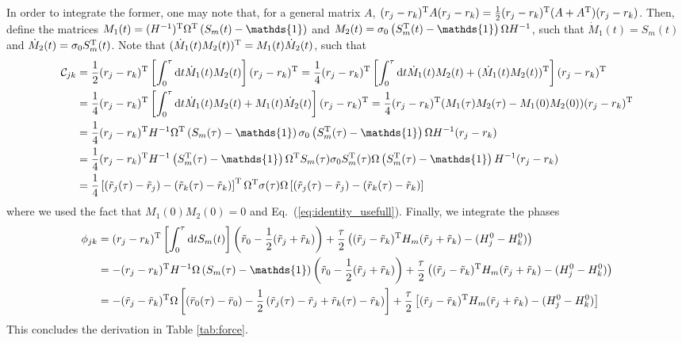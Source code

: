 \documentclass[%
reprint,
superscriptaddress,
nofootinbib,
 amsmath,amssymb,
prx,
floatfix,
]{revtex4-2}
\begin{document}
In order to integrate the former, one may note that, for a general matrix $A$,  $(r_j - r_k)^{\rm T} A (r_j - r_k)  = \frac{1}{2} (r_j - r_k)^{\rm T} (A+A^{\rm T}) (r_j - r_k)$. Then, define the matrices $M_1(t) = (H^{-1} )^{\rm T}  \Omega^{\rm T} \left(S_m(t) - \mathds{1} \right)  $ and $M_2(t) = \sigma_0 \left(S_m^{\rm T}(t) - \mathds{1} \right)  \Omega H^{-1}$, such that $\dot{M}_1(t)= S_m(t)$ and $ \dot{M}_2(t) =  \sigma_0 S_m^{\rm T} (t)$. Note that $(\dot{M}_1(t) M_2(t))^{\rm T} = M_1(t) \dot{M}_2(t)$, such that 
\begin{align}
    \mathcal{C}_{jk} &=  \frac{1}{2} (r_j - r_k)^{\rm T} \left[ \int_0^{\tau} \text{d} t \dot{M}_1(t) M_2(t)  \right] (r_j - r_k)^{\rm T} =  \frac{1}{4} (r_j - r_k)^{\rm T} \left[ \int_0^{\tau} \text{d} t  \dot{M}_1(t) M_2(t) + (\dot{M}_1(t) M_2(t))^{\rm T}  \right] (r_j - r_k)^{\rm T} \nonumber \\
    &=   \frac{1}{4} (r_j - r_k)^{\rm T} \left[ \int_0^{\tau} \text{d} t  \dot{M}_1(t) M_2(t) + M_1(t) \dot{M}_2(t) \right] (r_j - r_k)^{\rm T}  =   \frac{1}{4} (r_j - r_k)^{\rm T} ( M_1(\tau) M_2(\tau) - M_1(0) M_2(0))  (r_j - r_k)^{\rm T}\nonumber \\
    &=  \frac{1}{4} (r_j - r_k)^{\rm T} H^{-1}  \Omega^{\rm T} \left(S_m(\tau) - \mathds{1} \right)  \sigma_0 \left(S_m^{\rm T}(\tau) - \mathds{1} \right)  \Omega H^{-1} (r_j - r_k) \label{eq:integral_app_contr} \\
    &=  \frac{1}{4} (r_j - r_k)^{\rm T} H^{-1}  \left(S^{\rm T}_m(\tau) - \mathds{1} \right)  \Omega^{\rm T} S_m(\tau) \sigma_0 S^{\rm T}_m(\tau)\Omega  \left(S_m^{\rm T}(\tau) - \mathds{1} \right)  H^{-1} (r_j - r_k)\nonumber \\
    &=  \frac{1}{4} \left[ (\tilde{r}_j (\tau) - \tilde{r}_j)  - (\tilde{r}_k (\tau) - \tilde{r}_k ) \right]^{\rm T} \Omega^{\rm T} \sigma (\tau)   \Omega  \left[ (\tilde{r}_j (\tau) - \tilde{r}_j)  - (\tilde{r}_k (\tau) - \tilde{r}_k ) \right] 
\end{align}
where we used the fact that $M_1(0) M_2(0) = 0$ and Eq.~(\ref{eq:identity_usefull}). Finally, we integrate the phases
\begin{align}
\label{eq:phase_appendix_unitary}
    \phi_{jk} &=  (r_j - r_k)^{\rm T} \left[ \int_0^{\tau} \text{d} t S_m (t) \right] \left( \tilde{r}_0  - \frac{1}{2} (\tilde{r}_j + \tilde{r}_k) \right) + \frac{\tau}{2} \left( (\tilde{r}_j - \tilde{r}_k)^{\rm T} H_m (\tilde{r}_j + \tilde{r}_k) -  (H_j^0-H_k^0) \right) \nonumber \\ 
    &=  - (r_j - r_k)^{\rm T} H^{-1} \Omega \left( S_m (\tau)  - \mathds{1} \right) \left( \tilde{r}_0  - \frac{1}{2} (\tilde{r}_j + \tilde{r}_k) \right) + \frac{\tau}{2} \left( (\tilde{r}_j - \tilde{r}_k)^{\rm T} H_m (\tilde{r}_j + \tilde{r}_k) -  (H_j^0-H_k^0) \right) \\ 
    & =  - (\tilde{r}_j - \tilde{r}_k)^{\rm T} \Omega \left[ ( \bar{r}_0  (\tau) - \bar{r}_0 ) - \frac{1}{2} \left( \tilde{r}_j (\tau) - \tilde{r}_j + \tilde{r}_k (\tau) -  \tilde{r}_k  \right) \right] + \frac{\tau}{2} \left[ (\tilde{r}_j - \tilde{r}_k)^{\rm T} H_m (\tilde{r}_j + \tilde{r}_k) -  (H_j^0-H_k^0) \right] \nonumber
\end{align}
This concludes the derivation in Table \ref{tab:force}. 
\end{document}
